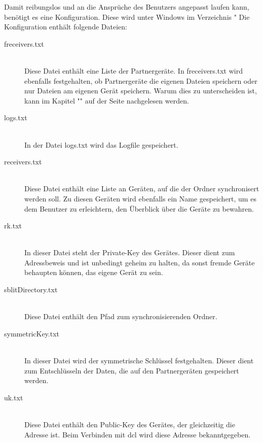 Damit \sblit reibungslos und an die Ansprüche des Benutzers angepasst laufen kann, benötigt es eine Konfiguration. Diese wird unter Windows im Verzeichnis "%
Die Konfiguration enthält folgende Dateien:
\begin{description}
	\item[{freceivers.txt}]\label{freceivers}  \hfill \\
	Diese Datei enthält eine Liste der Partnergeräte. In freceivers.txt wird ebenfalls festgehalten, ob Partnergeräte die eigenen Dateien speichern oder nur Dateien am eigenen Gerät speichern. Warum dies zu unterscheiden ist, kann im Kapitel "" auf der Seite \pageref{Partnerschaften} nachgelesen werden.
	\item[{logs.txt}] \hfill \\
	In der Datei logs.txt wird das Logfile  gespeichert.
	\item[{receivers.txt}] \hfill \\
	Diese Datei enthält eine Liste an Geräten, auf die der Ordner synchronisert werden soll. Zu diesen Geräten wird ebenfalls ein Name gespeichert, um es dem Benutzer zu erleichtern, den Überblick über die Geräte zu bewahren.
	\item[{rk.txt}] \hfill \\
	In dieser Datei steht der Private-Key des Gerätes. Dieser dient zum Adressbeweis und ist unbedingt geheim zu halten, da sonst fremde Geräte behaupten können, das eigene Gerät zu sein.
	\item[{sblitDirectory.txt}] \hfill \\
	Diese Datei enthält den Pfad zum synchronisierenden Ordner.
	\item[{symmetricKey.txt}] \hfill \\
	In dieser Datei wird der symmetrische Schlüssel festgehalten. Dieser dient zum Entschlüsseln der Daten, die auf den Partnergeräten gespeichert werden.
	\item[{uk.txt}] \hfill \\
	Diese Datei enthält den Public-Key des Gerätes, der gleichzeitig die Adresse ist. Beim Verbinden mit \gls{dcl} wird diese Adresse bekanntgegeben.
\end{description}